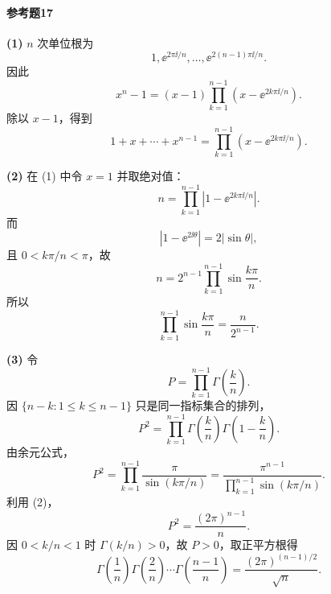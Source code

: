 \paragraph{参考题17}

\begin{xsolution}
\textbf{(1)} $n$ 次单位根为
\[
1,\ee^{2\pi\ii/n},\ldots,\ee^{2(n-1)\pi\ii/n}.
\]
因此
\[
x^n-1=(x-1)\prod_{k=1}^{n-1}
\left(x-\ee^{2k\pi\ii/n}\right).
\]
除以 $x-1$，得到
\[
\boxed{
1+x+\cdots+x^{n-1}
=\prod_{k=1}^{n-1}
\left(x-\ee^{2k\pi\ii/n}\right).}
\]

\textbf{(2)} 在 (1) 中令 $x=1$ 并取绝对值：
\[
n=\prod_{k=1}^{n-1}
\left|1-\ee^{2k\pi\ii/n}\right|.
\]
而
\[
\left|1-\ee^{2\ii\theta}\right|=2|\sin\theta|,
\]
且 $0<k\pi/n<\pi$，故
\[
n=2^{n-1}\prod_{k=1}^{n-1}\sin\frac{k\pi}{n}.
\]
所以
\[
\boxed{
\prod_{k=1}^{n-1}\sin\frac{k\pi}{n}
=\frac n{2^{n-1}}.}
\]

\textbf{(3)} 令
\[
P=\prod_{k=1}^{n-1}\Gamma\left(\frac kn\right).
\]
因 $\{n-k:1\leqslant k\leqslant n-1\}$ 只是同一指标集合的排列，
\[
P^2=\prod_{k=1}^{n-1}
\Gamma\left(\frac kn\right)
\Gamma\left(1-\frac kn\right).
\]
由余元公式，
\[
P^2=\prod_{k=1}^{n-1}
\frac\pi{\sin(k\pi/n)}
=\frac{\pi^{n-1}}
{\prod_{k=1}^{n-1}\sin(k\pi/n)}.
\]
利用 (2)，
\[
P^2=\frac{(2\pi)^{n-1}}n.
\]
因 $0<k/n<1$ 时 $\Gamma(k/n)>0$，故 $P>0$，取正平方根得
\[
\boxed{
\Gamma\left(\frac1n\right)
\Gamma\left(\frac2n\right)\cdots
\Gamma\left(\frac{n-1}{n}\right)
=\frac{(2\pi)^{(n-1)/2}}{\sqrt n}.}
\]
\end{xsolution}
